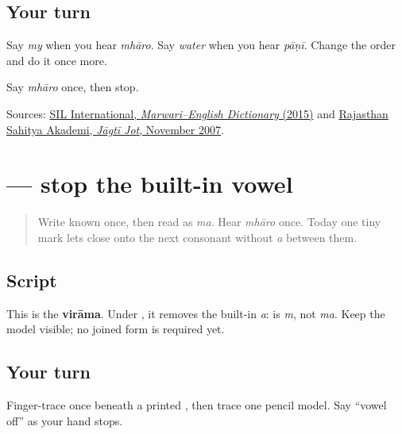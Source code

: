 \subsection*{Your turn}
Say \emph{my} when you hear \emph{mhāro}. Say \emph{water} when you hear \emph{pāṇī}. Change the order and do it once more.

\begin{tcolorbox}[breakable,colback=teal!4,colframe=teal!35!black,title={Before you move on}]
Say \emph{mhāro} once, then stop.

Sources: \href{https://nepal.sil.org/resources/archives/63768}{SIL International, \emph{Marwari–English Dictionary} (2015)} and \href{https://rsad.artandculture.rajasthan.gov.in/content/dam/doitassets/art-and-culture/Rajasthani-Bhasha-Sahitya-Avm-Sanskriti-Academy-Bikaner/pdf/JJ\_All\_Pdf/JJ\_36\_08\_08\_November\_to\_November\_2007.pdf}{Rajasthan Sahitya Akademi, \emph{Jāgtī Jot}, November 2007}.
\end{tcolorbox}
\section[\texorpdfstring{\mw{्} (virāma)}{् (virāma)}]{ — stop the built-in vowel}

\label{lesson:MW-W05-virama}



\begin{quote}
Write known \textbf{} once, then read \textbf{} as \emph{ma}. Hear \emph{mhāro} once. Today one tiny mark lets \textbf{} close onto the next consonant without \emph{a} between them.
\end{quote}

\subsection*{Script}

\begin{quote}
\end{quote}

This is the \textbf{virāma}. Under \textbf{}, it removes the built-in \emph{a}: \textbf{} is \emph{m}, not \emph{ma}. Keep the model visible; no joined form is required yet.

\subsection*{Your turn}
Finger-trace \textbf{} once beneath a printed \textbf{}, then trace one pencil model. Say \textquotedblleft{}vowel off\textquotedblright{} as your hand stops.


